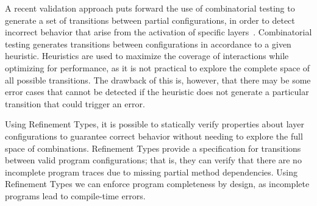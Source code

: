 A recent validation approach puts forward the use of combinatorial testing to 
generate a set of transitions between partial configurations, in order to detect incorrect behavior that 
arise from the activation of specific layers~\cite{martou24}. Combinatorial testing generates transitions 
between configurations in accordance to a given heuristic. Heuristics are used to maximize the 
coverage of interactions while optimizing for performance, as it is not practical to explore the complete 
space of all possible transitions. The drawback of this is, however, that there may be some error cases 
that cannot be detected if the heuristic does not generate a particular transition that could trigger an error.

Using Refinement Types, it is possible to statically verify properties about layer configurations to 
guarantee correct behavior without needing to explore the full space of combinations.
Refinement Types provide a specification for transitions between valid program configurations; that is, 
they can verify that there are no incomplete program traces due to missing partial method dependencies. Using 
Refinement Types we can enforce program completeness by design, as incomplete programs lead to 
compile-time errors.


\endinput

